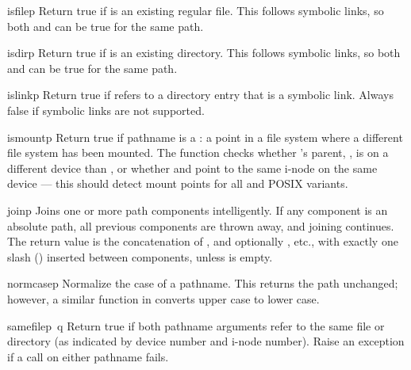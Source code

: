 \begin{funcdesc}{isfile}{p}
Return true if  is an existing regular file.  This follows
symbolic links, so both  and  can be
true for the same path.
\end{funcdesc}

\begin{funcdesc}{isdir}{p}
Return true if  is an existing directory.  This follows
symbolic links, so both  and  can be true
for the same path.
\end{funcdesc}

\begin{funcdesc}{islink}{p}
Return true if
refers to a directory entry that is a symbolic link.
Always false if symbolic links are not supported.
\end{funcdesc}

\begin{funcdesc}{ismount}{p}
Return true if pathname  is a : a point in a
file system where a different file system has been mounted.  The
function checks whether 's parent, , is on a
different device than , or whether  and
 point to the same i-node on the same device --- this should
detect mount points for all \UNIX{} and POSIX variants.
\end{funcdesc}

\begin{funcdesc}{join}{p}
Joins one or more path components intelligently.  If any component is
an absolute path, all previous components are thrown away, and joining
continues.  The return value is the concatenation of , and
optionally , etc., with exactly one slash () inserted
between components, unless  is empty.
\end{funcdesc}

\begin{funcdesc}{normcase}{p}
Normalize the case of a pathname.  This returns the path unchanged;
however, a similar function in  converts upper case to
lower case.
\end{funcdesc}

\begin{funcdesc}{samefile}{p\, q}
Return true if both pathname arguments refer to the same file or directory
(as indicated by device number and i-node number).
Raise an exception if a  call on either pathname fails.
\end{funcdesc}

